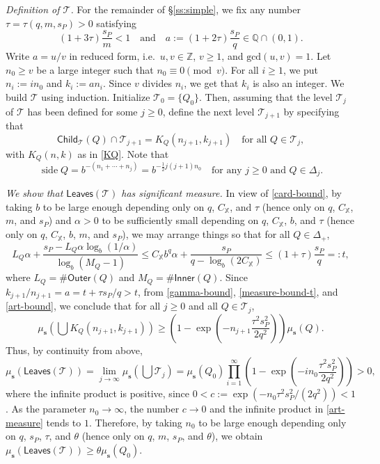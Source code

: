 \documentclass[12pt]{amsart}
\theoremstyle{definition}
\theoremstyle{remark}
\newcommand{\ZZ}{\mathbb{Z}}
\newcommand{\XX}{\mathbb{X}}
\newcommand{\side}{\mathop\mathrm{side}\nolimits}
\newcommand{\muse}{\mu_{\mathbf{s}}}
\newcommand{\leaves}{\mathsf{Leaves}}
\newcommand{\Child}{\mathsf{Child}}
\newcommand{\Outer}{\mathsf{Outer}}
\newcommand{\Inner}{\mathsf{Inner}}
\numberwithin{figure}{section}
\numberwithin{equation}{section}
\begin{document}
\emph{Definition of $\mathcal{T}$.} For the remainder of \S\ref{ss:simple}, we fix any number $\tau=\tau(q,m,s_P)>0$ satisfying  \begin{equation}\label{tau61} (1+3\tau)\frac{s_P}{m}<1\quad\text{and}\quad a:=(1+2\tau)\frac{s_P}{q}\in\mathbb{Q}\cap(0,1).\end{equation} Write $a=u/v$ in reduced form, i.e.~$u,v\in\ZZ$, $v\geq 1$, and $\mathrm{gcd}(u,v)=1$. Let $n_0\geq v$ be a large integer such that $n_0\equiv 0\pmod{v}$. For all $i\geq 1$, we put $n_i:=in_0$ and $k_i:=an_i$. Since $v$ divides $n_i$, we get that $k_i$ is also an integer. We build $\mathcal{T}$ using induction. Initialize $\mathcal{T}_0=\{Q_0\}$. Then, assuming that the level $\mathcal{T}_j$ of $\mathcal{T}$ has been defined for some $j\geq 0$, define the next level $\mathcal{T}_{j+1}$ by specifying that \begin{equation}\label{next-level} \Child_\mathcal{T}(Q)\cap \mathcal{T}_{j+1} = K_Q(n_{j+1},k_{j+1})\quad\text{for all }Q\in\mathcal{T}_j,\end{equation} with $K_{Q}(n,k)$ as in \eqref{KQ}. Note that \begin{equation}\label{art-side}\side Q = b^{-(n_1+\cdots+n_j)}=b^{-\frac{1}{2}j(j+1)n_0}\quad\text{for any $j\geq 0$ and $Q\in\Delta_j$}.\end{equation}

\emph{We show that $\leaves(\mathcal{T})$ has significant measure.} In view of \eqref{card-bound}, by taking $b$ to be large enough depending only on $q$, $C_\XX$, and $\tau$ (hence only on $q$, $C_\XX$, $m$, and $s_P$) and $\alpha>0$ to be sufficiently small depending on $q$, $C_\XX$, $b$, and $\tau$ (hence only on $q$, $C_\XX$, $b$, $m$, and $s_P$), we may arrange things so that for all $Q\in\Delta_+$, \begin{equation}\label{art-bound} L_Q\alpha + \frac{s_P-L_Q\alpha\log_b(1/\alpha)}{\log_b(M_Q-1)} \leq C_\XX b^q\alpha+\frac{s_P}{q-\log_b(2C_\XX)} \leq (1+\tau)\frac{s_P}{q}=:t,\end{equation} where $L_Q=\#\Outer(Q)$ and $M_Q=\#\Inner(Q)$. Since $k_{j+1}/n_{j+1}=a=t+\tau s_P/q>t$, from \eqref{gamma-bound},  \eqref{measure-bound-t}, and \eqref{art-bound}, we conclude that for all $j\geq 0$ and all $Q\in\mathcal{T}_j$, \begin{equation}\muse\left(\textstyle\bigcup K_Q(n_{j+1},k_{j+1})\right)\geq \left(1-\exp\left(-n_{j+1}\frac{\tau^2s_P^2}{2q^2}\right)\right)\muse(Q).\end{equation} Thus, by continuity from above, \begin{equation}\label{art-measure}
\muse(\leaves(\mathcal{T})) = \lim_{j\rightarrow \infty} \muse\left(\textstyle\bigcup\mathcal{T}_j\right)=\muse(Q_0)\prod_{i=1}^\infty \left(1-\exp\left(-in_0\frac{\tau^2s_P^2}{2q^2}\right)\right)>0,\end{equation} where the infinite product is positive, since $0< c:= \exp(-n_0\tau^2s_P^2/(2q^2))<1$. As the parameter $n_0\rightarrow\infty$, the number $c\rightarrow 0$ and the infinite product in \eqref{art-measure} tends to $1$. Therefore, by taking $n_0$ to be large enough depending only on $q$, $s_P$, $\tau$, and $\theta$ (hence only on $q$, $m$, $s_P$, and $\theta$), we obtain $\muse(\leaves(\mathcal{T}))\geq \theta\muse(Q_0)$.
\end{document}
